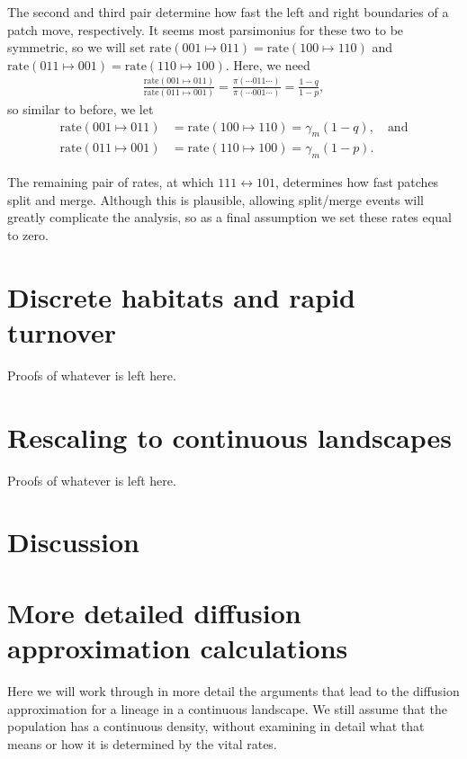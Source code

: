 \documentclass{article}
\newcommand{\rate}[2]{\text{rate}(#1\mapsto#2)}
\begin{document}
The second and third pair determine how fast the left and right boundaries of a patch move, respectively.
It seems most parsimonius for these two to be symmetric,
so we will set $\rate{001}{011} = \rate{100}{110}$ and $\rate{011}{001} = \rate{110}{100}$.
Here, we need
\begin{align*}
    \frac{\rate{001}{011}}{\rate{011}{001}}
    =
    \frac{\pi(\cdots011\cdots)}{\pi(\cdots001\cdots)}
    =
    \frac{1-q}{1-p} ,
\end{align*}
so similar to before, we let
\begin{align}
    \rate{001}{011} &= \rate{100}{110} = \gamma_m (1-q), \quad \text{and} \\
    \rate{011}{001} &= \rate{110}{100} = \gamma_m (1-p) .
\end{align}

The remaining pair of rates, at which $111 \leftrightarrow 101$,
determines how fast patches split and merge.
Although this is plausible, allowing split/merge events will greatly complicate the analysis,
so as a final assumption we set these rates equal to zero.




\section{Discrete habitats and rapid turnover}

Proofs of whatever is left here.


\section{Rescaling to continuous landscapes}

Proofs of whatever is left here.


\section{Discussion}



\appendix


\section{More detailed diffusion approximation calculations}

Here we will work through in more detail the arguments that lead to the diffusion approximation
for a lineage in a continuous landscape.
We still assume that the population has a continuous density,
without examining in detail what that means or how it is determined by the vital rates.
\end{document}
